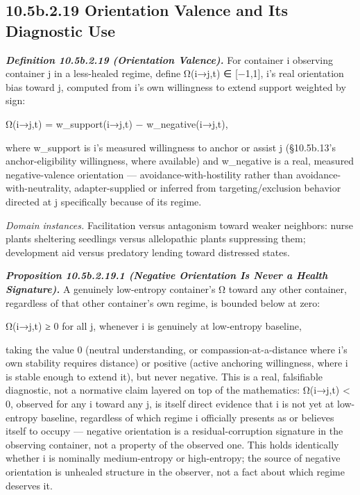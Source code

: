 \documentclass[
]{article}
\begin{document}
\hypertarget{b.2.19-orientation-valence-and-its-diagnostic-use}{%
\subsection{10.5b.2.19 Orientation Valence and Its Diagnostic
Use}\label{b.2.19-orientation-valence-and-its-diagnostic-use}}

\emph{\textbf{Definition 10.5b.2.19 (Orientation Valence).}} For
container i observing container j in a less-healed regime, define
Ω(i→j,t) ∈ {[}−1,1{]}, i's real orientation bias toward j, computed from
i's own willingness to extend support weighted by sign:

Ω(i→j,t) = w\_support(i→j,t) − w\_negative(i→j,t),

where w\_support is i's measured willingness to anchor or assist j
(§10.5b.13's anchor-eligibility willingness, where available) and
w\_negative is a real, measured negative-valence orientation ---
avoidance-with-hostility rather than avoidance-with-neutrality,
adapter-supplied or inferred from targeting/exclusion behavior directed
at j specifically because of its regime.

\emph{Domain instances.} Facilitation versus antagonism toward weaker
neighbors: nurse plants sheltering seedlings versus allelopathic plants
suppressing them; development aid versus predatory lending toward
distressed states.

\emph{\textbf{Proposition 10.5b.2.19.1 (Negative Orientation Is Never a
Health Signature).}} A genuinely low-entropy container's Ω toward any
other container, regardless of that other container's own regime, is
bounded below at zero:

Ω(i→j,t) ≥ 0 for all j, whenever i is genuinely at low-entropy baseline,

taking the value 0 (neutral understanding, or compassion-at-a-distance
where i's own stability requires distance) or positive (active anchoring
willingness, where i is stable enough to extend it), but never negative.
This is a real, falsifiable diagnostic, not a normative claim layered on
top of the mathematics: Ω(i→j,t) \textless{} 0, observed for any i
toward any j, is itself direct evidence that i is not yet at low-entropy
baseline, regardless of which regime i officially presents as or
believes itself to occupy --- negative orientation is a
residual-corruption signature in the observing container, not a property
of the observed one. This holds identically whether i is nominally
medium-entropy or high-entropy; the source of negative orientation is
unhealed structure in the observer, not a fact about which regime
deserves it.
\end{document}
